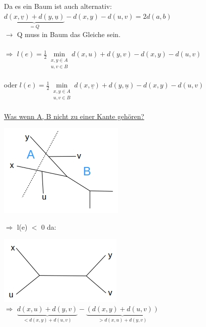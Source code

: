 \newpage

Da es ein Baum ist auch alternativ:
$\underbrace{d(x,\underline{v}) + d(y,\underline{u})}_{=Q} - d(x,y) - d(u,v) = 2d(a,b)$\\
$\rightarrow$ Q muss in Baum das Gleiche sein.\\\\
$\Rightarrow$ $l(e) = \frac{1}{2} \min \limits_{\substack{x,y \in A\\ u,v \in B}} d(x,u) + d(y,v) - d(x,y) - d(u,v)$\\\\
oder $l(e) = \frac{1}{2} \min \limits_{\substack{x,y \in A\\ u,v \in B}} d(x,\underline{v}) + d(y,\underline{u}) - d(x,y) - d(u,v)$
\\\\
\underline{Was wenn A, B nicht zu einer Kante gehören?}
\begin{center}
	\includegraphics[scale=1]{lectures/161209/pix/pic7.jpg}
\end{center}
$\Rightarrow$ l(e) $<$ 0 da:
\begin{center}
	\includegraphics[scale=1]{lectures/161209/pix/pic8.jpg}\\
	$\Rightarrow$ $\underbrace{d(x,u) + d(y,v)}_{<d(x,y) + d(u,v)} - \underbrace{(d(x,y) + d(u,v))}_{>d(x,u) + d(y,v)}$
\end{center}

